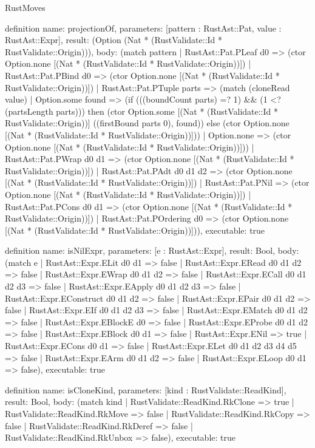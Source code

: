 \begin{lexlean}{RustMoves}
\begin{semanticmodule}
definition{
  name: projectionOf,
  parameters: [pattern : RustAst::Pat, value : RustAst::Expr],
  result: (Option (Nat * (RustValidate::Id * RustValidate::Origin))),
  body: (match pattern
    | RustAst::Pat.PLeaf d0 => (ctor Option.none [(Nat * (RustValidate::Id * RustValidate::Origin))])
    | RustAst::Pat.PBind d0 => (ctor Option.none [(Nat * (RustValidate::Id * RustValidate::Origin))])
    | RustAst::Pat.PTuple parts => (match (cloneRead value)
      | Option.some found => (if (((boundCount parts) =? 1) && (1 <? (partsLength parts))) then (ctor Option.some [(Nat * (RustValidate::Id * RustValidate::Origin))] ((firstBound parts 0), found)) else (ctor Option.none [(Nat * (RustValidate::Id * RustValidate::Origin))]))
      | Option.none => (ctor Option.none [(Nat * (RustValidate::Id * RustValidate::Origin))]))
    | RustAst::Pat.PWrap d0 d1 => (ctor Option.none [(Nat * (RustValidate::Id * RustValidate::Origin))])
    | RustAst::Pat.PAdt d0 d1 d2 => (ctor Option.none [(Nat * (RustValidate::Id * RustValidate::Origin))])
    | RustAst::Pat.PNil => (ctor Option.none [(Nat * (RustValidate::Id * RustValidate::Origin))])
    | RustAst::Pat.PCons d0 d1 => (ctor Option.none [(Nat * (RustValidate::Id * RustValidate::Origin))])
    | RustAst::Pat.POrdering d0 => (ctor Option.none [(Nat * (RustValidate::Id * RustValidate::Origin))])),
  executable: true
}

definition{
  name: isNilExpr,
  parameters: [e : RustAst::Expr],
  result: Bool,
  body: (match e
    | RustAst::Expr.ELit d0 d1 => false
    | RustAst::Expr.ERead d0 d1 d2 => false
    | RustAst::Expr.EWrap d0 d1 d2 => false
    | RustAst::Expr.ECall d0 d1 d2 d3 => false
    | RustAst::Expr.EApply d0 d1 d2 d3 => false
    | RustAst::Expr.EConstruct d0 d1 d2 => false
    | RustAst::Expr.EPair d0 d1 d2 => false
    | RustAst::Expr.EIf d0 d1 d2 d3 => false
    | RustAst::Expr.EMatch d0 d1 d2 => false
    | RustAst::Expr.EBlockE d0 => false
    | RustAst::Expr.EProbe d0 d1 d2 => false
    | RustAst::Expr.EBlock d0 d1 => false
    | RustAst::Expr.ENil => true
    | RustAst::Expr.ECons d0 d1 => false
    | RustAst::Expr.ELet d0 d1 d2 d3 d4 d5 => false
    | RustAst::Expr.EArm d0 d1 d2 => false
    | RustAst::Expr.ELoop d0 d1 => false),
  executable: true
}

definition{
  name: isCloneKind,
  parameters: [kind : RustValidate::ReadKind],
  result: Bool,
  body: (match kind
    | RustValidate::ReadKind.RkClone => true
    | RustValidate::ReadKind.RkMove => false
    | RustValidate::ReadKind.RkCopy => false
    | RustValidate::ReadKind.RkDeref => false
    | RustValidate::ReadKind.RkUnbox => false),
  executable: true
}


\end{semanticmodule}
\end{lexlean}
